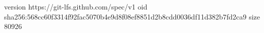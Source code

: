 version https://git-lfs.github.com/spec/v1
oid sha256:568cc60f3314f92fac5070b4e9d8f08ef8851d2b8cdd0036df11d382b7fd2ca9
size 80926
